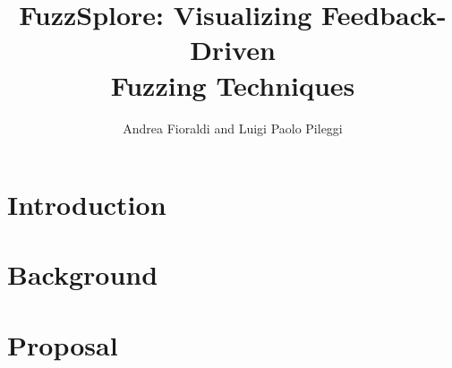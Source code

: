 \documentclass[]{article}
\title{FuzzSplore: Visualizing Feedback-Driven\\Fuzzing Techniques}
\author{Andrea Fioraldi and Luigi Paolo Pileggi}
\begin{document}
\maketitle

\section{Introduction}




\section{Background}



\section{Proposal}

\cite{besensitive}



\end{document}
